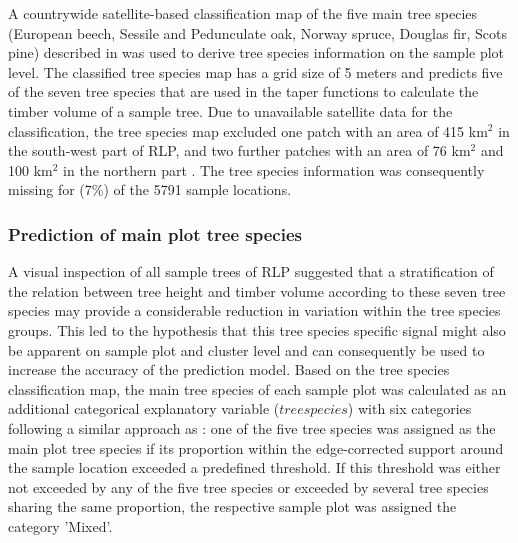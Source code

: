 A countrywide satellite-based classification map of the five main tree species (European beech, Sessile and Pedunculate oak, Norway spruce, Douglas fir, Scots pine) described in \citet{stoffels2015} was used to derive tree species information on the sample plot level. The classified tree species map has a grid size of 5 meters and predicts five of the seven tree species that are used in the \bwi{} taper functions \citep{kublin2013} to calculate the timber volume of a sample tree. Due to unavailable satellite data for the classification, the tree species map excluded one patch with an area of 415 km$^2$ in the south-west part of RLP, and two further patches with an area of 76 km$^2$ and 100 km$^2$ in the northern part \citep{stoffels2015}. The tree species information was consequently missing for  (7\%) of the 5791 sample locations.

\subsubsection*{Prediction of main plot tree species}

A visual inspection of all \bwi{} sample trees of RLP suggested that a stratification of the relation between tree height and timber volume according to these seven tree species may provide a considerable reduction in variation within the tree species groups. This led to the hypothesis that this tree species specific signal might also be apparent on sample plot and cluster level and can consequently be used to increase the accuracy of the prediction model. Based on the tree species classification map, the main tree species of each sample plot was calculated as an additional categorical explanatory variable ($treespecies$) with six categories following a similar approach as \citet{latifi2012}: one of the five tree species was assigned as the main plot tree species if its proportion within the edge-corrected support around the sample location exceeded a predefined threshold. If this threshold was either not exceeded by any of the five tree species or exceeded by several tree species sharing the same proportion, the respective sample plot was assigned the category 'Mixed'. \par


